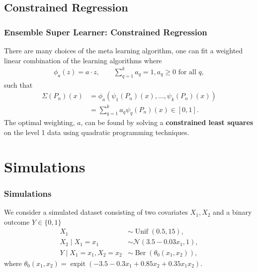 \documentclass{beamer}
\newcommand{\q}{q}
\newcommand{\ml}{k}
\newcommand{\la}{\psi}
\newcommand{\meta}{\phi}
\newcommand{\esl}{\Sigma}
\DeclareMathOperator{\expit}{expit}
\begin{document}
\subsection{Constrained Regression}
\begin{frame}
    \frametitle{Ensemble Super Learner: Constrained Regression} 
    There are many choices of the meta learning algorithm, one can fit a weighted linear combination of the learning algorithms where 
    \begin{align*}
        \meta_{a}(z) = a \cdot z, \qquad \sum_{\q = 1}^{\ml} a_{\q} = 1, a_{\q} \geq 0 \text{ for all } \q,
    \end{align*}
    such that 
    \begin{align*}
        \esl(P_n)(x) &=  \meta_{a}(\la_{1}(P_n)(x) , \dots , \la_{\ml}(P_n)(x))\\
                     &= \sum_{\q = 1}^{\ml} a_{\q} \la_\q(P_n)(x) \in [0,1].
    \end{align*}
    The optimal weighting, $ a $, can be found by solving a \textbf{constrained least squares} on the level 1 data using quadratic programming techniques. 
\end{frame}

\section{Simulations}
\begin{frame}
    \frametitle{Simulations} 
    We consider a simulated dataset consisting of two covariates $ X_1, X_2 $ and a binary outcome $ Y \in \{0,1\} $ 
    \begin{align*}
        X_1 &\sim \operatorname{Unif}(0.5, 15),\\
        X_2 \mid X_1 = x_1 &\sim \mathcal{N}(3.5-0.03x_1, 1),\\
        Y \mid X_1 = x_1, X_2 = x_2 &\sim \operatorname{Ber}(\theta_0(x_1, x_2)),
    \end{align*}
    where $\theta_0(x_1, x_2) = \expit({-3.5 - 0.3x_1 + 0.85x_2 + 0.35x_1x_2})$. 
\end{frame}
\end{document}
